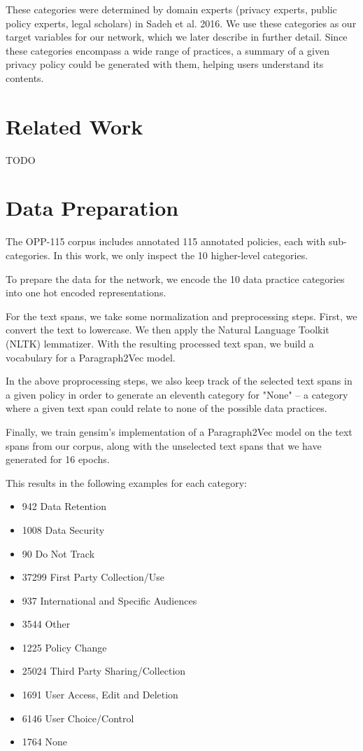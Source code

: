\documentclass[12pt, letterpaper]{article}
\begin{document}
These categories were determined by domain experts (privacy experts, public policy experts, legal scholars) in Sadeh et al. 2016. We use these categories as our target variables for our network, which we later describe in further detail. Since these categories encompass a wide range of practices, a summary of a given privacy policy could be generated with them, helping users understand its contents.

\section{Related Work}
TODO

\section{Data Preparation}
The OPP-115 corpus includes annotated 115 annotated policies, each with sub-categories. In this work, we only inspect the 10 higher-level categories. 

To prepare the data for the network, we encode the 10 data practice categories into one hot encoded representations.  

For the text spans, we take some normalization and preprocessing steps. First, we convert the text to lowercase. We then apply the Natural Language Toolkit (NLTK) lemmatizer. With the resulting processed text span, we build a vocabulary for a Paragraph2Vec model.

In the above proprocessing steps, we also keep track of the selected text spans in a given policy in order to generate an eleventh category for "None" -- a category where a given text span could relate to none of the possible data practices.

Finally, we train gensim's implementation of a Paragraph2Vec model on the text spans from our corpus, along with the unselected text spans that we have generated for 16 epochs.

This results in the following examples for each category:
\begin{itemize}
\item 942 Data Retention
\item 1008 Data Security
\item 90 Do Not Track
\item 37299 First Party Collection/Use
\item 937 International and Specific Audiences
\item 3544 Other
\item 1225 Policy Change
\item 25024 Third Party Sharing/Collection
\item 1691 User Access, Edit and Deletion
\item 6146 User Choice/Control
\item 1764 None
\end{itemize}
\end{document}
